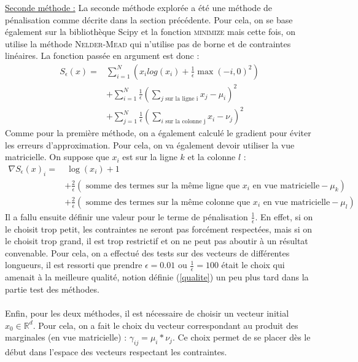 \documentclass[12pt]{article}
\newcommand{\Rd}{\mathbb{R}^d}
\begin{document}
\vspace{0.2cm}
\underline{Seconde méthode :}
La seconde méthode explorée a été une méthode  de pénalisation comme décrite dans la section précédente. Pour cela, on se base également sur la bibliothèque Scipy et la fonction \textsc{minimize} mais cette fois, on utilise la méthode \textsc{Nelder-Mead} qui n'utilise pas de borne et de contraintes linéaires. La fonction passée en argument est donc :
\[
\begin{split}
S_{\epsilon}(x) = & \sum^{N}_{i=1}(x_ilog(x_i) + \frac{1}{\epsilon}\max(-i,0)^2)\\
& + \sum_{i=1}^N \frac{1}{\epsilon}(\sum_{j \text{ sur la ligne i}}x_j - \mu_i)^2 \\
 & + \sum_{j=1}^N \frac{1}{\epsilon}(\sum_{i \text{ sur la colonne j}}x_i - \nu_j)^2
\end{split}
\]
Comme pour la première méthode, on a également calculé le gradient pour éviter les erreurs d'approximation. Pour cela, on va également devoir utiliser la vue matricielle. On suppose que $x_i$ est sur la ligne $k$ et la colonne $l$ :
\[
\begin{split}
\nabla S_{\epsilon}(x)_i = &  \: \log(x_i) + 1 \\
&+ \frac{2}{\epsilon}(\text{ somme des termes sur la même ligne que } x_i \text{ en vue matricielle} - \mu_k)\\
&+  \frac{2}{\epsilon}(\text{ somme des termes sur la même colonne que } x_i \text{ en vue matricielle} - \mu_l)
\end{split}
\]
Il a fallu ensuite définir une valeur pour le terme de pénalisation $\frac{1}{\epsilon}$. En effet, si on le choisit trop petit, les contraintes ne seront pas forcément respectées, mais si on le choisit trop grand, il est trop restrictif et on ne peut pas aboutir à un résultat convenable. Pour cela, on a effectué des tests sur des vecteurs de différentes longueurs, il est ressorti que prendre $\epsilon = 0.01$ ou $\frac{1}{\epsilon} = 100 $ était le choix qui amenait à la meilleure qualité, notion définie (\ref{qualite}) un peu plus tard dans la partie test des méthodes.\\
\\
Enfin, pour les deux méthodes, il est nécessaire de choisir un vecteur initial $x_0 \in \Rd$. Pour cela, on a fait le choix du vecteur correspondant au produit des marginales (en vue matricielle) : $\gamma_{ij} = \mu_i * \nu_j$. Ce choix permet de se placer dès le début dans l'espace des vecteurs respectant les contraintes.
\end{document}
